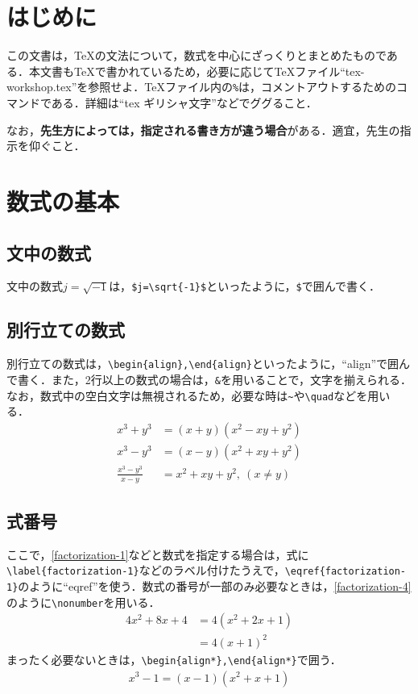 \documentclass[11pt,a4paper]{jsarticle}
\begin{document}
%
%
\section{はじめに}

この文書は，\TeX の文法について，数式を中心にざっくりとまとめたものである．本文書も\TeX で書かれているため，必要に応じて\TeX ファイル``tex-workshop.tex''を参照せよ．TeXファイル内の\verb|%|は，コメントアウトするためのコマンドである．詳細は``tex ギリシャ文字''などでググること．

なお，\textbf{先生方によっては，指定される書き方が違う場合}がある．適宜，先生の指示を仰ぐこと．

\section{数式の基本}

\subsection{文中の数式}

文中の数式$j=\sqrt{-1}$は，\verb|$j=\sqrt{-1}$|といったように，\verb|$|で囲んで書く．

\subsection{別行立ての数式}

別行立ての数式は，\verb|\begin{align},\end{align}|といったように，``align''で囲んで書く．また，2行以上の数式の場合は，\verb|&|を用いることで，文字を揃えられる．なお，数式中の空白文字は無視されるため，必要な時は\verb|~|や\verb|\quad|などを用いる．
\begin{align}
  x^3+y^3             & =(x+y)\left(x^2-xy+y^2\right) \label{factorization-1} \\
  x^3-y^3             & =(x-y)\left(x^2+xy+y^2\right) \label{factorization-2} \\
  \frac{x^3-y^3}{x-y} & =x^2+xy+y^2,~(x\neq y) \label{factorization-3}
\end{align}

\subsection{式番号}

ここで，\eqref{factorization-1}などと数式を指定する場合は，式に\verb|\label{factorization-1}|などのラベル付けたうえで，\verb|\eqref{factorization-1}|のように``eqref''を使う．数式の番号が一部のみ必要なときは，\eqref{factorization-4}のように\verb|\nonumber|を用いる．
\begin{align}\label{factorization-4}
  4x^2+8x+4 & =4\left(x^2+2x+1\right)\nonumber \\
            & =4(x+1)^2
\end{align}
まったく必要ないときは，\verb|\begin{align*},\end{align*}|で囲う．
\begin{align*}
  x^3-1=(x-1)\left(x^2+x+1\right)
\end{align*}
\end{document}
